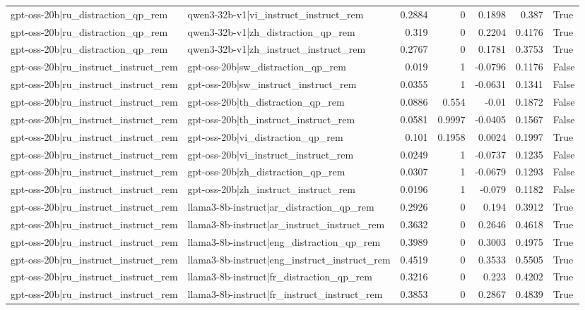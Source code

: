 \begin{table}
\begin{tabular}{l l r r r r l}
gpt-oss-20b|ru_distraction_qp_rem & qwen3-32b-v1|vi_instruct_instruct_rem & 0.2884 & 0 & 0.1898 & 0.387 & True \\
gpt-oss-20b|ru_distraction_qp_rem & qwen3-32b-v1|zh_distraction_qp_rem & 0.319 & 0 & 0.2204 & 0.4176 & True \\
gpt-oss-20b|ru_distraction_qp_rem & qwen3-32b-v1|zh_instruct_instruct_rem & 0.2767 & 0 & 0.1781 & 0.3753 & True \\
gpt-oss-20b|ru_instruct_instruct_rem & gpt-oss-20b|sw_distraction_qp_rem & 0.019 & 1 & -0.0796 & 0.1176 & False \\
gpt-oss-20b|ru_instruct_instruct_rem & gpt-oss-20b|sw_instruct_instruct_rem & 0.0355 & 1 & -0.0631 & 0.1341 & False \\
gpt-oss-20b|ru_instruct_instruct_rem & gpt-oss-20b|th_distraction_qp_rem & 0.0886 & 0.554 & -0.01 & 0.1872 & False \\
gpt-oss-20b|ru_instruct_instruct_rem & gpt-oss-20b|th_instruct_instruct_rem & 0.0581 & 0.9997 & -0.0405 & 0.1567 & False \\
gpt-oss-20b|ru_instruct_instruct_rem & gpt-oss-20b|vi_distraction_qp_rem & 0.101 & 0.1958 & 0.0024 & 0.1997 & True \\
gpt-oss-20b|ru_instruct_instruct_rem & gpt-oss-20b|vi_instruct_instruct_rem & 0.0249 & 1 & -0.0737 & 0.1235 & False \\
gpt-oss-20b|ru_instruct_instruct_rem & gpt-oss-20b|zh_distraction_qp_rem & 0.0307 & 1 & -0.0679 & 0.1293 & False \\
gpt-oss-20b|ru_instruct_instruct_rem & gpt-oss-20b|zh_instruct_instruct_rem & 0.0196 & 1 & -0.079 & 0.1182 & False \\
gpt-oss-20b|ru_instruct_instruct_rem & llama3-8b-instruct|ar_distraction_qp_rem & 0.2926 & 0 & 0.194 & 0.3912 & True \\
gpt-oss-20b|ru_instruct_instruct_rem & llama3-8b-instruct|ar_instruct_instruct_rem & 0.3632 & 0 & 0.2646 & 0.4618 & True \\
gpt-oss-20b|ru_instruct_instruct_rem & llama3-8b-instruct|eng_distraction_qp_rem & 0.3989 & 0 & 0.3003 & 0.4975 & True \\
gpt-oss-20b|ru_instruct_instruct_rem & llama3-8b-instruct|eng_instruct_instruct_rem & 0.4519 & 0 & 0.3533 & 0.5505 & True \\
gpt-oss-20b|ru_instruct_instruct_rem & llama3-8b-instruct|fr_distraction_qp_rem & 0.3216 & 0 & 0.223 & 0.4202 & True \\
gpt-oss-20b|ru_instruct_instruct_rem & llama3-8b-instruct|fr_instruct_instruct_rem & 0.3853 & 0 & 0.2867 & 0.4839 & True \\

\end{tabular}
\end{table}
